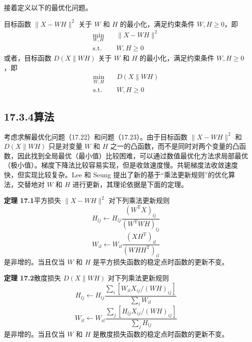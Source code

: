 \documentclass[UTF8,12pt,a4paper,fontset=fandol]{ctexart}
\begin{document}
接着定义以下的最优化问题。

目标函数 $\|X-WH\|^2$ 关于 $W$ 和 $H$ 的最小化，满足约束条件 $W,H\geqslant 0$，即
\begin{equation}
\begin{aligned}
\min_{W,H}\quad &\|X-WH\|^2\\
\text{s.t.}\quad &W,H\geqslant 0
\end{aligned}
\tag{17.22}
\end{equation}
或者，目标函数 $D(X\|WH)$ 关于 $W$ 和 $H$ 的最小化，满足约束条件 $W,H\geqslant 0$，即
\begin{equation}
\begin{aligned}
\min_{W,H}\quad &D(X\|WH)\\
\text{s.t.}\quad &W,H\geqslant 0
\end{aligned}
\tag{17.23}
\end{equation}

\subsection*{17.3.4\quad 算法}

考虑求解最优化问题（17.22）和问题（17.23）。由于目标函数 $\|X-WH\|^2$ 和 $D(X\|WH)$ 只是对变量 $W$ 和 $H$ 之一的凸函数，而不是同时对两个变量的凸函数，因此找到全局最优（最小值）比较困难，可以通过数值最优化方法求局部最优（极小值）。梯度下降法比较容易实现，但是收敛速度慢。共轭梯度法收敛速度快，但实现比较复杂。Lee 和 Seung 提出了新的基于“乘法更新规则”的优化算法，交替地对 $W$ 和 $H$ 进行更新，其理论依据是下面的定理。

\noindent\textbf{定理 17.1}\quad 平方损失 $\|X-WH\|^2$ 对下列乘法更新规则
\begin{equation}
H_{lj}\leftarrow H_{lj}\frac{(W^{\mathrm{T}}X)_{lj}}{(W^{\mathrm{T}}WH)_{lj}}
\tag{17.24}
\end{equation}
\begin{equation}
W_{il}\leftarrow W_{il}\frac{(XH^{\mathrm{T}})_{il}}{(WHH^{\mathrm{T}})_{il}}
\tag{17.25}
\end{equation}
是非增的。当且仅当 $W$ 和 $H$ 是平方损失函数的稳定点时函数的更新不变。

\noindent\textbf{定理 17.2}\quad 散度损失 $D(X\|WH)$ 对下列乘法更新规则
\begin{equation}
H_{lj}\leftarrow H_{lj}\frac{\displaystyle\sum_i[W_{il}X_{ij}/(WH)_{ij}]}{\displaystyle\sum_i W_{il}}
\tag{17.26}
\end{equation}
\begin{equation}
W_{il}\leftarrow W_{il}\frac{\displaystyle\sum_j[H_{lj}X_{ij}/(WH)_{ij}]}{\displaystyle\sum_j H_{lj}}
\tag{17.27}
\end{equation}
是非增的。当且仅当 $W$ 和 $H$ 是散度损失函数的稳定点时函数的更新不变。
\end{document}
